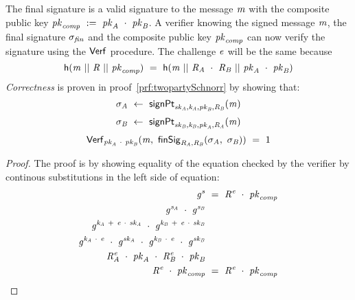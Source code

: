 The final signature is a valid signature to the message $\mathit{m}$ with the composite public key $\mathit{pk}_{\mathit{comp}} ~:=~ \mathit{pk}_{\mathit{A}} ~\cdot~ \mathit{pk}_{\mathit{B}}$.
A verifier knowing the signed message $\mathit{m}$, the final signature $\sigma_{\mathit{fin}}$ and the composite public key $\mathit{pk}_{\mathit{comp}}$ can now verify the signature using the $\mathsf{Verf}$ procedure.
The challenge $\mathit{e}$ will be the same because
\[ \mathsf{h} (\mathit{m} ~||~ \mathit{R} ~||~ \mathit{pk}_{\mathit{comp}}) ~=~ \mathsf{h} (\mathit{m} ~||~ \mathit{R}_{\mathit{A}} ~\cdot~ \mathit{R}_{\mathit{B}} ~||~ \mathit{pk}_{\mathit{A}} ~\cdot~ \mathit{pk}_{\mathit{B}}) \]
\textit{Correctness} is proven in proof~\ref{prf:twopartySchnorr} by showing
that:~
\[ \sigma_{\mathit{A}} ~\leftarrow~ \mathsf{signPt}_{\mathit{sk}_{\mathit{A}},\mathit{\mathit{k}_{\mathit{A}}},\mathit{pk}_{\mathit{B}},\mathit{R}_{\mathit{B}}}(\mathit{m}) \]
\[ \sigma_{\mathit{B}} ~\leftarrow~ \mathsf{signPt}_{\mathit{sk}_{\mathit{B}},\mathit{\mathit{k}_{\mathit{B}}},\mathit{pk}_{\mathit{A}},\mathit{R}_{\mathit{A}}}(\mathit{m}) \]
\[ \mathsf{Verf}_{\mathit{pk}_{\mathit{A}} ~\cdot~ \mathit{pk}_{\mathit{B}}}(\mathit{m} ,~ \mathsf{finSig}_{\mathit{R}_{\mathit{A}},\mathit{R}_{\mathit{B}}}(\sigma_{\mathit{A}} ,~ \sigma_{\mathit{B}})) ~=~ 1 \]

\begin{proof}
    \label{prf:twopartySchnorr}
    The proof is by showing equality of the equation checked by the verifier by continous substitutions in the left side of equation:
    \begin{align}
        \mathit{g}^{\mathit{s}} &~=~ \mathit{R}^{\mathit{e}} ~\cdot~ \mathit{pk}_{\mathit{comp}} \\
        \mathit{g}^{\mathit{s}_{\mathit{A}}} ~\cdot~ \mathit{g}^{\mathit{s}_{\mathit{B}}} & \\
        \mathit{g}^{\mathit{\mathit{k}_{\mathit{A}}} ~+~ \mathit{e} ~\cdot~ \mathit{sk}_{\mathit{A}}} ~\cdot~ \mathit{g}^{\mathit{\mathit{k}_{\mathit{B}}} ~+~ \mathit{e} ~\cdot~ \mathit{sk}_{\mathit{B}}} & \\
        \mathit{g}^{\mathit{\mathit{k}_{\mathit{A}}} ~\cdot~ \mathit{e}} ~\cdot~ \mathit{g}^{\mathit{sk}_{\mathit{A}}} ~\cdot~ \mathit{g}^{\mathit{\mathit{k}_{\mathit{B}}} ~\cdot~ \mathit{e}} ~\cdot~ \mathit{g}^{\mathit{sk}_{\mathit{B}}} & \\
        \mathit{R}_{\mathit{A}}^{\mathit{e}} ~\cdot~ \mathit{pk}_{\mathit{A}} ~\cdot~ \mathit{R}_{\mathit{B}}^{\mathit{e}} ~\cdot~ \mathit{pk}_{\mathit{B}} & \\
        \mathit{R}^{\mathit{e}} ~\cdot~ \mathit{pk}_{\mathit{comp}} & ~=~ \mathit{R}^{\mathit{e}} ~\cdot~ \mathit{pk}_{\mathit{comp}}
    \end{align}
\end{proof}

